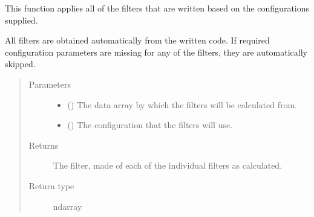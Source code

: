 \documentclass[letterpaper,10pt,english]{sphinxmanual}
\begin{document}
\begin{fulllineitems}
\label{\detokenize{docstrings/ifa_smeargle.analysis.base_functions:ifa_smeargle.analysis.base_functions.create_filter_from_configuration}}
This function applies all of the filters that are written based
on the configurations supplied.

All filters are obtained automatically from the written code.
If required configuration parameters are missing for any of the
filters, they are automatically skipped.
\begin{quote}\begin{description}
\item[{Parameters}] \leavevmode\begin{itemize}
\item {} 
 () \textendash{} The data array by which the filters will be calculated from.

\item {} 
 () \textendash{} The configuration that the filters will use.

\end{itemize}

\item[{Returns}] \leavevmode
{} \textendash{} The filter, made of each of the individual filters as
calculated.

\item[{Return type}] \leavevmode
ndarray

\end{description}\end{quote}

\end{fulllineitems}

\end{document}
